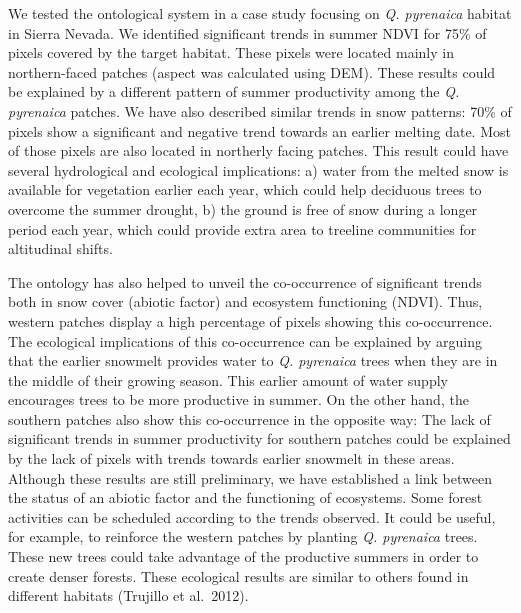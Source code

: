We tested the ontological system in a case study focusing on \emph{Q. pyrenaica} habitat in Sierra Nevada. We identified significant trends in summer NDVI for 75\% of pixels covered by the target habitat. These pixels were located mainly in northern-faced patches (aspect was calculated using DEM). These results could be explained by a different pattern of summer productivity among the \emph{Q. pyrenaica} patches. We have also described similar trends in snow patterns: 70\% of pixels show a significant and negative trend towards an earlier melting date. Most of those pixels are also located in northerly facing patches. This result could have several hydrological and ecological implications: a) water from the melted snow is available for vegetation earlier each year, which could help deciduous trees to overcome the summer drought, b) the ground is free of snow during a longer period each year, which could provide extra area to treeline communities for altitudinal shifts.

The ontology has also helped to unveil the co-occurrence of significant trends both in snow cover (abiotic factor) and ecosystem functioning (NDVI). Thus, western patches display a high percentage of pixels showing this co-occurrence. The ecological implications of this co-occurrence can be explained by arguing that the earlier snowmelt provides water to \emph{Q. pyrenaica }trees when they are in the middle of their growing season. This earlier amount of water supply encourages trees to be more productive in summer. On the other hand, the southern patches also show this co-occurrence in the opposite way: The lack of significant trends in summer productivity for southern patches could be explained by the lack of pixels with trends towards earlier snowmelt in these areas. Although these results are still preliminary, we have established a link between the status of an abiotic factor and the functioning of ecosystems. Some forest activities can be scheduled according to the trends observed. It could be useful, for example, to reinforce the western patches by planting \emph{Q. pyrenaica} trees. These new trees could take advantage of the productive summers in order to create denser forests. These ecological results are similar to others found in different habitats (Trujillo et al.~2012).

